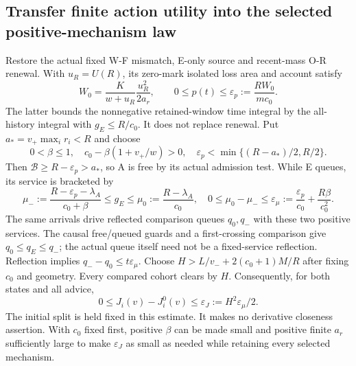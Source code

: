 \documentclass[11pt,a4paper]{article}
\newcommand{\Bud}{\mathcal B}
\begin{document}
\subsection{Transfer finite action utility into the selected positive-mechanism law}
Restore the actual fixed W-F mismatch, E-only source and recent-mass O-R
renewal. With $u_R=U(R)$, its zero-mark isolated loss area and account satisfy
\begin{equation}
 W_0=\frac{K}{w+u_R}\frac{u_R^2}{2a_r},\qquad
 0\leq p(t)\leq\varepsilon_p:=\frac{RW_0}{mc_0}.
 \label{eq:lossbound}
\end{equation}
The latter bounds the nonnegative retained-window time integral by the
all-history integral with $g_E\leq R/c_0$. It does not replace renewal.
Put $a_*=v_+\max_i r_i<R$ and choose
\begin{equation}
 0<\beta\leq1,\quad c_0-\beta(1+v_+/w)>0,\quad
 \varepsilon_p<\min\{(R-a_*)/2,R/2\}.
 \label{eq:smallparameters}
\end{equation}
Then $\Bud\geq R-\varepsilon_p>a_*$, so A is free by its actual admission
test. While E queues, its service is bracketed by
\begin{equation}
 \mu_-:=\frac{R-\varepsilon_p-\lambda_A}{c_0+\beta}
 \leq g_E\leq\mu_0:=\frac{R-\lambda_A}{c_0},\quad
 0\leq\mu_0-\mu_-\leq\varepsilon_\mu
 :=\frac{\varepsilon_p}{c_0}+\frac{R\beta}{c_0^2}.
 \label{eq:servicebrackets}
\end{equation}
The same arrivals drive reflected comparison queues $q_0,q_-$ with these
two positive services. The causal free/queued guards and a first-crossing
comparison give $q_0\leq q_E\leq q_-$; the actual queue itself need not be a
fixed-service reflection. Reflection implies $q_--q_0\leq t\varepsilon_\mu$.
Choose $H>L/v_-+2(c_0+1)M/R$ after fixing $c_0$ and geometry. Every compared
cohort clears by $H$. Consequently, for both states and all advice,
\begin{equation}
 0\leq J_i(v)-J_i^0(v)\leq\varepsilon_J:=H^2\varepsilon_\mu/2.
 \label{eq:valuebound}
\end{equation}
The initial split is held fixed in this estimate. It makes no derivative
closeness assertion. With $c_0$ fixed first, positive $\beta$ can be made
small and positive finite $a_r$ sufficiently large to make $\varepsilon_J$
as small as needed while retaining every selected mechanism.
\end{document}
